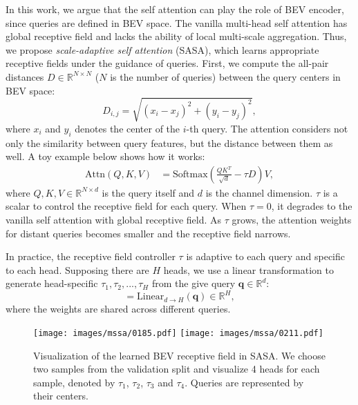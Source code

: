\documentclass[10pt,twocolumn,letterpaper]{article}
\begin{document}
In this work, we argue that the self attention can play the role of BEV encoder, since queries are defined in BEV space. The vanilla multi-head self attention has global receptive field and lacks the ability of local multi-scale aggregation. Thus, we propose \textit{scale-adaptive self attention} (SASA), which learns appropriate receptive fields under the guidance of queries. First, we compute the all-pair distances $D \in \mathbb{R}^{N \times N}$ ($N$ is the number of queries) between the query centers in BEV space:
\begin{equation}
  D_{i, j} = \sqrt{(x_i - x_j)^2 + (y_i - y_j)^2},
\end{equation}
where $x_i$ and $y_i$ denotes the center of the $i$-th query. The attention considers not only the similarity between query features, but the distance between them as well. A toy example below shows how it works:
\begin{align}
  \text{Attn}(Q, K, V) &= \text{Softmax}(\frac{QK^T}{\sqrt{d}} - \tau D) V,
\end{align}
where $Q, K, V \in \mathbb{R}^{N \times d}$ is the query itself and $d$ is the channel dimension. $\tau$ is a scalar to control the receptive field for each query. When $\tau = 0$, it degrades to the vanilla self attention with global receptive field. As $\tau$ grows, the attention weights for distant queries becomes smaller and the receptive field narrows.

In practice, the receptive field controller $\tau$ is adaptive to each query and specific to each head. Supposing there are $H$ heads, we use a linear transformation to generate head-specific $\tau_1, \tau_2, ..., \tau_H$ from the give query $\mathbf{q} \in \mathbb{R}^d$:
\begin{equation}
  [\tau_1, \tau_2, ..., \tau_H] = \text{Linear}_{d \to H} (\mathbf{q}) \in \mathbb{R}^{H},
\end{equation}
where the weights are shared across different queries.

\begin{figure}[t]
  \centering
  \texttt{[image: images/mssa/0185.pdf]}
  \texttt{[image: images/mssa/0211.pdf]}
  \vspace{-20pt}
  \caption{Visualization of the learned BEV receptive field in SASA. We choose two samples from the validation split and visualize 4 heads for each sample, denoted by $\tau_1$, $\tau_2$, $\tau_3$ and $\tau_4$. Queries are represented by their centers.}
  \label{fig:mssa_receptive_field}
  \vspace{-5pt}
\end{figure}
\end{document}
